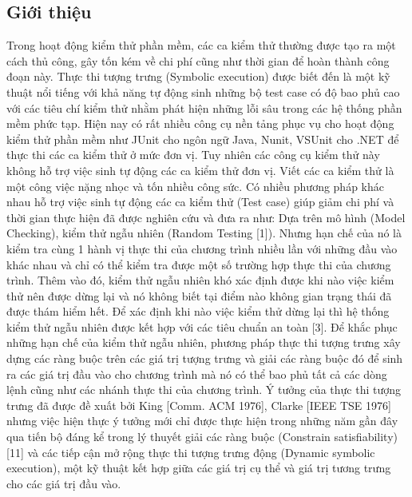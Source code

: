 \documentclass[12pt,a4paper]{article}
\begin{document}
\subsection{Giới thiệu}
Trong hoạt động kiểm thử phần mềm, các ca kiểm thử thường được tạo ra một cách thủ công, gây tốn kém về chi phí cũng như thời gian để hoàn thành công đoạn này. Thực thi tượng trưng (Symbolic execution) được biết đến là một kỹ thuật nổi tiếng với khả năng tự động sinh những bộ test case có độ bao phủ cao với các tiêu chí kiểm thử nhằm phát hiện những lỗi sâu trong các hệ thống phần mềm phức tạp.\newline
\indent Hiện nay có rất nhiều công cụ nền tảng phục vụ cho hoạt động kiểm thử phần mềm như JUnit cho ngôn ngữ Java, Nunit, VSUnit cho .NET để thực thi các ca kiểm thử ở mức đơn vị. Tuy nhiên các công cụ kiểm thử này không hỗ trợ việc sinh tự động các ca kiểm thử đơn vị. Viết các ca kiểm thử là một công việc nặng nhọc và tốn nhiều công sức. Có nhiều phương pháp khác nhau hỗ trợ việc sinh tự động các ca kiểm thử (Test case) giúp giảm chi phí và thời gian thực hiện đã được nghiên cứu và đưa ra như: Dựa trên mô hình (Model Checking), kiểm thử ngẫu nhiên (Random Testing [1]). Nhưng hạn chế của nó là kiểm tra cùng 1 hành vị thực thi của chương trình nhiều lần với những đầu vào khác nhau và chỉ có thể kiểm tra được một số trường hợp thực thi của chương trình. Thêm vào đó, kiểm thử ngẫu nhiên khó xác định được khi nào việc kiểm thử nên được dừng lại và nó không biết tại điểm nào không gian trạng thái đã được thám hiểm hết. Để xác định khi nào việc kiểm thử dừng lại thì hệ thống kiểm thử ngẫu nhiên được kết hợp với các tiêu chuẩn an toàn [3]. Để khắc phục những hạn chế của kiểm thử ngẫu nhiên, phương pháp thực thi tượng trưng xây dựng các ràng buộc trên các giá trị tượng trưng và giải các ràng buộc đó để sinh ra các giá trị đầu vào cho chương trình mà nó có thể bao phủ tất cả các dòng lệnh cũng như các nhánh thực thi của chương trình.\newline
\indent Ý tưởng của thực thi tượng trưng đã được đề xuất bởi King [Comm. ACM 1976], Clarke [IEEE TSE 1976] nhưng việc hiện thực ý tưởng mới chỉ được thực hiện trong những năm gần đây qua tiến bộ đáng kể trong lý thuyết giải các ràng buộc (Constrain satisfiability) [11] và các tiếp cận mở rộng thực thi tượng trưng động (Dynamic symbolic execution), một kỹ thuật kết hợp giữa các giá trị cụ thể và giá trị tương trưng cho các giá trị đầu vào.\newline
\end{document}
